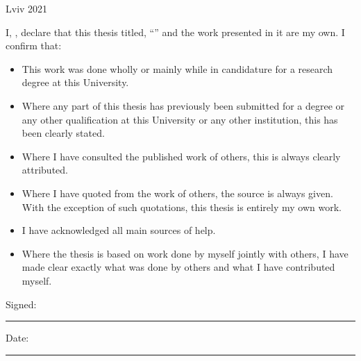\documentclass[
    11pt,
    english,
    singlespacing,
    headsepline,
    openany,
]{MastersThesis}
\begin{document}
\begin{titlepage}
\begin{center}
\vfill
{\large Lviv 2021}\\[4cm] %

\end{center}
\end{titlepage}


\begin{declaration}
\addchaptertocentry{\authorshipname} %
\noindent I, \authorname, declare that this thesis titled, \enquote{\ttitle} and the work presented in it are my own. I confirm that:

\begin{itemize} 
\item This work was done wholly or mainly while in candidature for a research degree at this University.
\item Where any part of this thesis has previously been submitted for a degree or any other qualification at this University or any other institution, this has been clearly stated.
\item Where I have consulted the published work of others, this is always clearly attributed.
\item Where I have quoted from the work of others, the source is always given. With the exception of such quotations, this thesis is entirely my own work.
\item I have acknowledged all main sources of help.
\item Where the thesis is based on work done by myself jointly with others, I have made clear exactly what was done by others and what I have contributed myself.
\end{itemize}
 
\noindent Signed:\\
\rule[0.5em]{25em}{0.5pt} %
 
\noindent Date:\\
\rule[0.5em]{25em}{0.5pt} %
\end{declaration}

\cleardoublepage

\end{document}
